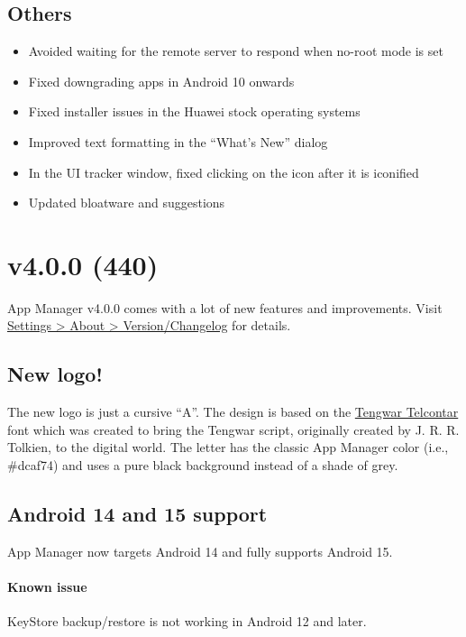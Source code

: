 \subsection{Others}
\begin{itemize}
    \item Avoided waiting for the remote server to respond when no-root mode is set
    \item Fixed downgrading apps in Android 10 onwards
    \item Fixed installer issues in the Huawei stock operating systems
    \item Improved text formatting in the ``What's New'' dialog
    \item In the UI tracker window, fixed clicking on the icon after it is iconified
    \item Updated bloatware and suggestions
\end{itemize}

\section{v4.0.0 (440)}\label{sec:v4.0.0-(440)}

App Manager v4.0.0 comes with a lot of new features and improvements. Visit
\href{app-manager://settings/about/version}{Settings > About > Version/Changelog} for details.

\subsection{New logo!}
The new logo is just a cursive ``A''. The design is based on the
\href{https://freetengwar.sourceforge.net/}{Tengwar Telcontar} font which was created to bring the
Tengwar script, originally created by J. R. R. Tolkien, to the digital world. The letter has the
classic App Manager color (i.e., \#dcaf74) and uses a pure black background instead of a shade of
grey.

\subsection{Android 14 and 15 support}
App Manager now targets Android 14 and fully supports Android 15.

\paragraph{Known issue} KeyStore backup/restore is not working in Android 12 and later.

